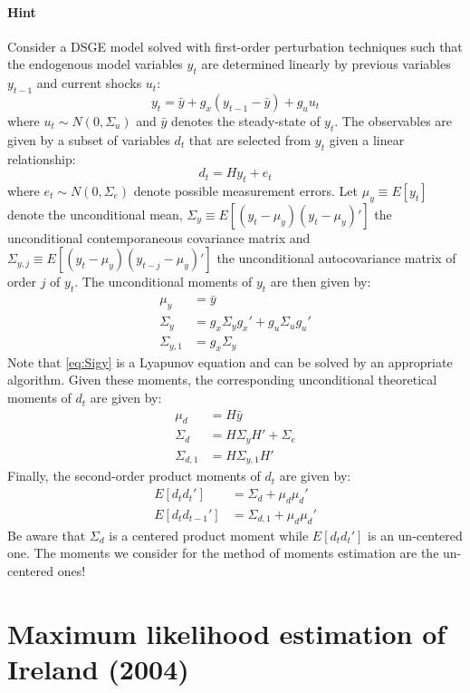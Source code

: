 \documentclass{article}
\begin{document}
\paragraph{Hint}
Consider a DSGE model solved with first-order perturbation techniques such that the endogenous model variables $y_t$ are determined linearly by previous variables $y_{t-1}$ and current shocks $u_t$: 
$$y_t = \bar{y} + g_x (y_{t-1} - \bar{y}) + g_u u_t$$
where $u_t \sim N(0,\Sigma_u)$ and $\bar{y}$ denotes the steady-state of $y_t$. The observables are given by a subset of variables $d_t$ that are selected from $y_t$ given a linear relationship:
$$d_t = H y_t + e_t$$
where $e_t \sim N(0,\Sigma_e)$ denote possible measurement errors. Let $\mu_y \equiv E[y_t]$ denote the unconditional mean, $\Sigma_y \equiv E[(y_t - \mu_y)(y_t - \mu_y)']$ the unconditional contemporaneous covariance matrix and $\Sigma_{y,j} \equiv E[(y_t - \mu_y)(y_{t-j} - \mu_y)']$ the unconditional autocovariance matrix of order $j$ of $y_t$. The unconditional moments of $y_t$ are then given by:
\begin{align}
	\mu_y &= \bar{y} \nonumber
	\\
	\Sigma_y &= g_x \Sigma_y g_x' + g_u \Sigma_u g_u' \label{eq:Sigy}
	\\
	\Sigma_{y,1} &= g_x \Sigma_{y}
\end{align}
Note that \eqref{eq:Sigy} is a Lyapunov equation and can be solved by an appropriate algorithm. Given these moments, the corresponding unconditional theoretical moments of $d_t$ are given by:
\begin{align*}
	\mu_d & = H \bar{y}
	\\
	\Sigma_d &= H \Sigma_y H' + \Sigma_e
	\\
	\Sigma_{d,1} &=  H \Sigma_{y,1} H'
\end{align*}
Finally, the second-order product moments of $d_t$ are given by:
\begin{align*}
	E[d_t d_t'] & = \Sigma_d + \mu_d \mu_d'
	\\
	E[d_t d_{t-1}'] & =\Sigma_{d,1} + \mu_d \mu_d'
\end{align*}
Be aware that $\Sigma_d$ is a centered product moment while $E[d_t d_t']$ is an un-centered one. The moments we consider for the method of moments estimation are the un-centered ones!




\newpage 


\section[Maximum likelihood estimation of Ireland (2004)]{Maximum likelihood estimation of Ireland (2004)\label{ex:Ireland2004ML}}
\end{document}
